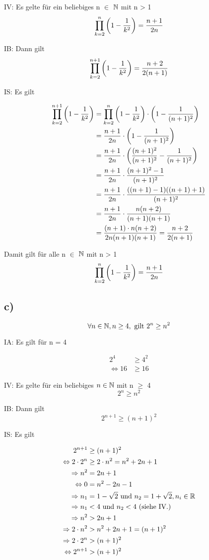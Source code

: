 \documentclass[a4paper, 11pt]{article}
\begin{document}
IV:
  Es gelte für ein beliebiges n \(\in\) \(\mathbb{N}\) mit n > 1
$$ \prod_{k=2}^{n} \left(1 - \frac{1}{k^2}\right) = \frac{n + 1}{2n} $$

IB:
  Dann gilt
$$ \prod_{k=2}^{n + 1} \left(1 - \frac{1}{k^2}\right) = \frac{n + 2}{2(n + 1)} $$

IS:
  Es gilt

\begin{align*}
    \prod_{k = 2}^{n + 1} \left(1 - \frac{1}{k^2}\right) &= \prod_{k = 2}^{n} \left(1 - \frac{1}{k^2}\right) \cdot \left(1 - \frac{1}{(n + 1)^2}\right) \\
    &= \frac{n + 1}{2n} \cdot \left(1 - \frac{1}{(n + 1)^2}\right) \\
    &= \frac{n + 1}{2n} \cdot \left(\frac{(n+1)^2}{(n+1)^2} - \frac{1}{(n + 1)^2}\right) \\
    &= \frac{n + 1}{2n} \cdot \frac{(n+1)^2 - 1}{(n+1)^2} \\
    &= \frac{n + 1}{2n} \cdot \frac{((n+1) - 1)((n+1) + 1)}{(n + 1)^2} \\
    &= \frac{n + 1}{2n} \cdot \frac{n(n + 2)}{(n + 1)(n + 1)} \\
    &= \frac{(n + 1) \cdot n(n + 2)}{2n(n + 1)(n + 1)}
    = \frac{n + 2}{2(n + 1)}
\end{align*}


Damit gilt für alle n \(\in\) \(\mathbb{N}\) mit n > 1
$$ \prod_{k=2}^{n} \left(1 - \frac{1}{k^2}\right) = \frac{n + 1}{2n} $$

\subsection{c)}
\label{sec:orgd6acfbf}
$$ \forall n \in \mathbb{N}, n \geq 4, \text{ gilt } 2^n \geq n^2 $$

IA:
  Es gilt für n = 4

\begin{align*}
    2^4 &\geq 4^2 \\
    \Leftrightarrow 16 &\geq 16
\end{align*}

IV:
  Es gelte für ein beliebiges \(n \in \mathbb{N}\) mit n \(\ge\) 4
$$ 2^n \geq n^2 $$

IB:
  Dann gilt
$$ 2^{n + 1} \geq (n + 1)^2 $$

IS:
  Es gilt

\begin{align*}
    2^{n + 1} &\geq (n + 1)^2 \\
    \Leftrightarrow 2 \cdot 2^n &\geq 2 \cdot n^2 = n^2 + 2n + 1 \\
    \Rightarrow n^2 &= 2n + 1 \\
    \Leftrightarrow 0 &= n^2 - 2n - 1 \\
    \Rightarrow n_1 &= 1 - \sqrt{2} \text{ und } n_2 = 1 + \sqrt{2}, n_i \in \mathbb{R} \\
    \Rightarrow n_1 &< 4 \text{ und } n_2 < 4 \text{ (siehe IV.)} \\
    \Rightarrow n^2 &> 2n + 1 \\
    \Rightarrow 2 \cdot n^2 &> n^2 + 2n + 1 = (n + 1)^2 \\
    \Rightarrow 2 \cdot 2^n &> (n + 1)^2 \\
    \Leftrightarrow 2^{n + 1} &> (n + 1)^2
\end{align*}
\end{document}
